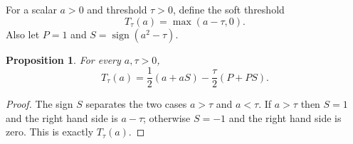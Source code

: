 \documentclass{article}
\newtheorem{proposition}{Proposition}
\begin{document}
For a scalar $a>0$ and threshold $\tau>0$, define the soft threshold
\[
T_\tau(a)=\max(a-\tau,0).
\]
Also let $P=1$ and $S=\operatorname{sign}(a^2-\tau)$.

\begin{proposition}\label{prop:threshold}
For every $a,\tau>0$,
\[
T_\tau(a)=\frac12(a+aS)-\frac{\tau}{2}(P+PS).
\]
\end{proposition}
\begin{proof}
The sign $S$ separates the two cases $a>\tau$ and $a<\tau$. If $a>\tau$ then
$S=1$ and the right hand side is $a-\tau$; otherwise $S=-1$ and the right hand
side is zero. This is exactly $T_\tau(a)$.
\end{proof}
\end{document}
